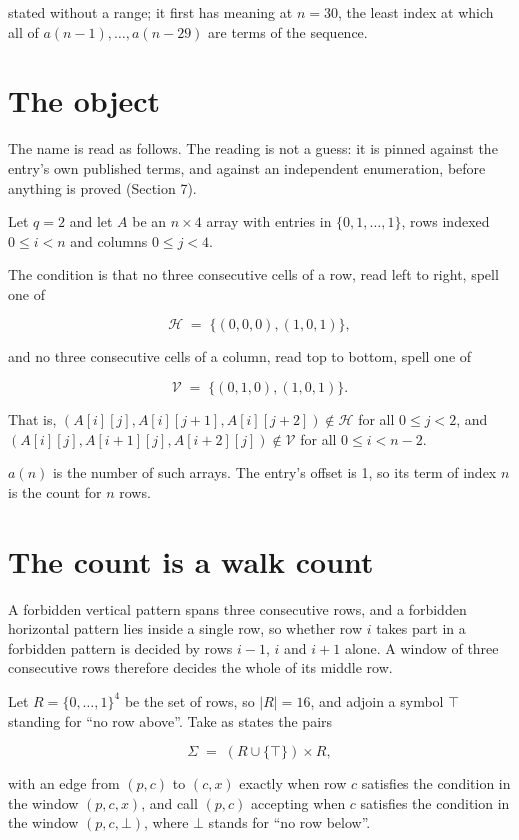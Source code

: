 \documentclass[11pt]{article}
\theoremstyle{definition}
\begin{document}
stated without a range; it first has meaning at $n = 30$, the least index at which all of $a(n-1),\dots,a(n-29)$ are terms of the sequence.

\section{The object}

The name is read as follows. The reading is not a guess: it is pinned against the entry's own published terms, and against an independent enumeration, before anything is proved (Section 7).

Let $q = 2$ and let $A$ be an $n \times 4$ array with entries in $\{0,1,\dots,1\}$, rows indexed $0 \le i < n$ and columns $0 \le j < 4$.

The condition is that no three consecutive cells of a row, read left to right, spell one of

\[\mathcal{H} \;=\; \{(0,0,0), (1,0,1)\},\]

and no three consecutive cells of a column, read top to bottom, spell one of

\[\mathcal{V} \;=\; \{(0,1,0), (1,0,1)\}.\]

That is, $(A[i][j],A[i][j{+}1],A[i][j{+}2]) \notin \mathcal{H}$ for all $0 \le j < 2$, and $(A[i][j],A[i{+}1][j],A[i{+}2][j]) \notin \mathcal{V}$ for all $0 \le i < n-2$.

$a(n)$ is the number of such arrays. The entry's offset is 1, so its term of index $n$ is the count for $n$ rows.

\section{The count is a walk count}

A forbidden vertical pattern spans three consecutive rows, and a forbidden horizontal pattern lies inside a single row, so whether row $i$ takes part in a forbidden pattern is decided by rows $i-1$, $i$ and $i+1$ alone. A window of three consecutive rows therefore decides the whole of its middle row.

Let $R = \{0,\dots,1\}^{4}$ be the set of rows, so $|R| = 16$, and adjoin a symbol $\top$ standing for ``no row above''. Take as states the pairs

\[\Sigma \;=\; (R \cup \{\top\}) \times R,\]

with an edge from $(p,c)$ to $(c,x)$ exactly when row $c$ satisfies the condition in the window $(p,c,x)$, and call $(p,c)$ accepting when $c$ satisfies the condition in the window $(p,c,\bot)$, where $\bot$ stands for ``no row below''.
\end{document}
